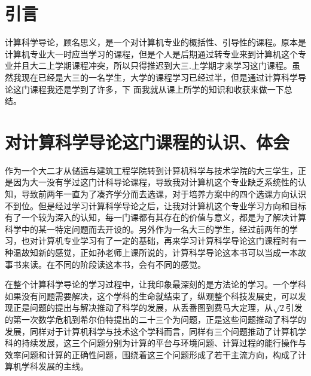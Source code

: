 \documentclass{article}
\begin{document}
\thispagestyle{empty}
\newpage
\setcounter{page}{1}
\section{引言}
计算科学导论，顾名思义，是一个对计算机专业的概括性、引导性的课程。原本是计算机专业大一时应当学习的课程，但是个人是后期通过转专业来到计算机这个专业并且大二上学期课程冲突，所以只得推迟到大三.上学期才来学习这门课程。虽然我现在已经是大三的一名学生，大学的课程学习已经过半，但是通过计算科学导论这门课程我还是学到了许多，下 面我就从课上所学的知识和收获来做一下总结。

\section{对计算科学导论这门课程的认识、体会}
作为一个大二才从储运与建筑工程学院转到计算机科学与技术学院的大三学生，正是因为大一没有学过这门计科导论课程，导致我对计算机这个专业缺乏系统性的认知，导致前两年一直为了凑齐学分而去选课，对于培养方案中的四个选课方向认识不到位。但是经过学习计算科学导论之后，让我对计算机这个专业学习方向和目标有了一个较为深入的认知，每一门课都有其存在的价值与意义，都是为了解决计算科学中的某一特定问题而去开设的。另外作为一名大三的学生，经过前两年的学习，也对计算机专业学习有了一定的基础，再来学习计算科学导论这门课程时有一种温故知新的感觉，正如孙老师上课所说的，计算科学导论这本书可以当成一本故事书来读。在不同的阶段读这本书，会有不同的感觉。
\par

在整个计算科学导论的学习过程中，让我印象最深刻的是方法论的学习。一个学科如果没有问题需要解决，这个学科的生命就结束了，纵观整个科技发展史，可以发现正是问题的提出与解决推动了科学的发展，从丢番图到费马大定理，从$\sqrt{2}$引发的第一次数学危机到希尔伯特提出的二十三个为问题，正是这些问题推动了科学的发展，同样对于计算机科学与技术这个学科而言，同样有三个问题推动了计算机学科的持续发展，这三个问题分别为计算的平台与环境问题、计算过程的能行操作与效率问题和计算的正确性问题，围绕着这三个问题形成了若干主流方向，构成了计算机学科发展的主线。
\par
\end{document}
